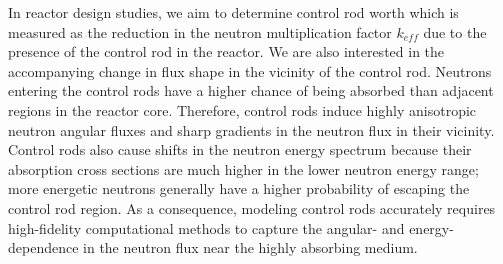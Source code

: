 In reactor design studies, we aim to determine control rod worth which is measured as the reduction
in the neutron multiplication factor $k_{eff}$ due to the presence of the control rod in the
reactor. We are also interested in the accompanying change in flux shape in the vicinity of the
control rod. Neutrons entering the control rods have a higher chance of being absorbed than
adjacent regions in the reactor core. Therefore, control rods induce highly anisotropic neutron
angular fluxes and sharp gradients in the neutron flux in their vicinity. Control rods also cause
shifts in the neutron energy spectrum because their absorption cross sections are much higher in
the lower neutron energy range; more energetic neutrons generally have a higher probability of
escaping the control rod region. As a consequence, modeling control rods accurately requires
high-fidelity computational methods to capture the angular- and energy-dependence in the neutron
flux near the highly absorbing medium.

